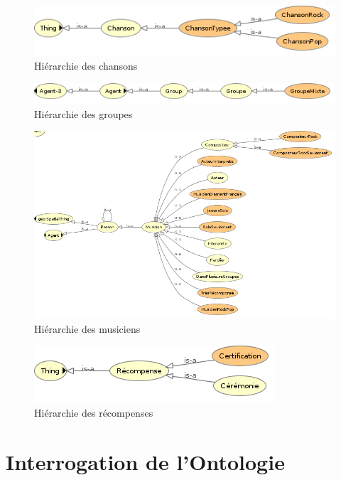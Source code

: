 \documentclass{article}
\begin{document}
\begin{figure}[H]
    \center
    \includegraphics[scale=.5]{img/chanson.png}
    \caption{Hiérarchie des chansons}
\end{figure}

\begin{figure}[H]
    \center
    \includegraphics[scale=.5]{img/groupe.png}
    \caption{Hiérarchie des groupes}
\end{figure}

\begin{figure}[H]
    \center
    \includegraphics[scale=.5]{img/musicien.png}
    \caption{Hiérarchie des musiciens}
\end{figure}

\begin{figure}[H]
    \center
    \includegraphics[scale=.5]{img/recompense.png}
    \caption{Hiérarchie des récompenses}
\end{figure}

\newpage
\section{Interrogation de l'Ontologie}
\end{document}
